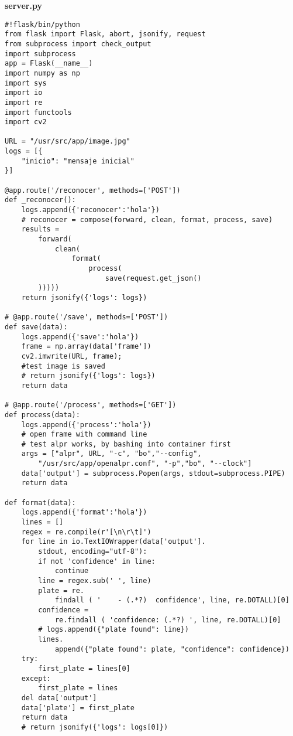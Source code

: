 {\sffamily \textbf{server.py}}
\begin{mdframed}[linecolor=black, topline=true, bottomline=true,
  leftline=false, rightline=false, backgroundcolor=LightGray,userdefinedwidth=\textwidth]
\begin{verbatim}
#!flask/bin/python
from flask import Flask, abort, jsonify, request
from subprocess import check_output
import subprocess
app = Flask(__name__)
import numpy as np
import sys
import io
import re
import functools
import cv2

URL = "/usr/src/app/image.jpg"
logs = [{
    "inicio": "mensaje inicial"	
}]

@app.route('/reconocer', methods=['POST'])
def _reconocer():
    logs.append({'reconocer':'hola'})
    # reconocer = compose(forward, clean, format, process, save)
    results = 
        forward(
            clean(
                format(
                    process(
                        save(request.get_json()
        )))))
    return jsonify({'logs': logs})

# @app.route('/save', methods=['POST'])
def save(data):
    logs.append({'save':'hola'})
    frame = np.array(data['frame'])
    cv2.imwrite(URL, frame); 
    #test image is saved
    # return jsonify({'logs': logs})
    return data

# @app.route('/process', methods=['GET'])
def process(data):
    logs.append({'process':'hola'})
    # open frame with command line
    # test alpr works, by bashing into container first
    args = ["alpr", URL, "-c", "bo","--config",
        "/usr/src/app/openalpr.conf", "-p","bo", "--clock"]
    data['output'] = subprocess.Popen(args, stdout=subprocess.PIPE)
    return data

def format(data):
    logs.append({'format':'hola'})
    lines = []
    regex = re.compile(r'[\n\r\t]')
    for line in io.TextIOWrapper(data['output'].
        stdout, encoding="utf-8"):
        if not 'confidence' in line:
            continue
        line = regex.sub(' ', line)
        plate = re.
            findall ( '    - (.*?)  confidence', line, re.DOTALL)[0]
        confidence = 
            re.findall ( 'confidence: (.*?) ', line, re.DOTALL)[0]
        # logs.append({"plate found": line})
        lines.
            append({"plate found": plate, "confidence": confidence})
    try:
        first_plate = lines[0]
    except:
        first_plate = lines
    del data['output']
    data['plate'] = first_plate
    return data
    # return jsonify({'logs': logs[0]})


\end{verbatim}
\end{mdframed}
